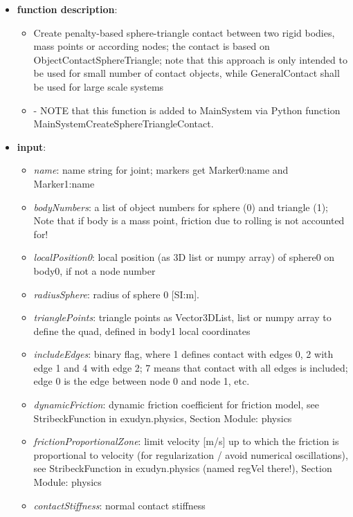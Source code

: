 \begin{itemize}[leftmargin=0.7cm]
\item[--]
{\bf function description}: \vspace{-6pt}
\begin{itemize}[leftmargin=1.2cm]
\setlength{\itemindent}{-0.7cm}
\item[]Create penalty-based sphere-triangle contact between two rigid bodies, mass points or according nodes; the contact is based on ObjectContactSphereTriangle; note that this approach is only intended to be used for small number of contact objects, while GeneralContact shall be used for large scale systems
\item[]- NOTE that this function is added to MainSystem via Python function MainSystemCreateSphereTriangleContact.
\end{itemize}
\item[--]
{\bf input}: \vspace{-6pt}
\begin{itemize}[leftmargin=1.2cm]
\setlength{\itemindent}{-0.7cm}
\item[]{\it name}: name string for joint; markers get Marker0:name and Marker1:name
\item[]{\it bodyNumbers}: a list of object numbers for sphere (0) and triangle (1); Note that if body is a mass point, friction due to rolling is not accounted for!
\item[]{\it localPosition0}: local position (as 3D list or numpy array) of sphere0 on body0, if not a node number
\item[]{\it radiusSphere}: radius of sphere 0 [SI:m].
\item[]{\it trianglePoints}: triangle points as Vector3DList, list or numpy array to define the quad, defined in body1 local coordinates
\item[]{\it includeEdges}: binary flag, where 1 defines contact with edges 0, 2 with edge 1 and 4 with edge 2; 7 means that contact with all edges is included; edge 0 is the edge between node 0 and node 1, etc.
\item[]{\it dynamicFriction}: dynamic friction coefficient for friction model, see StribeckFunction in exudyn.physics, Section Module: physics
\item[]{\it frictionProportionalZone}: limit velocity [m/s] up to which the friction is proportional to velocity (for regularization / avoid numerical oscillations), see StribeckFunction in exudyn.physics (named regVel there!), Section Module: physics
\item[]{\it contactStiffness}: normal contact stiffness

\end{itemize}
\end{itemize}
